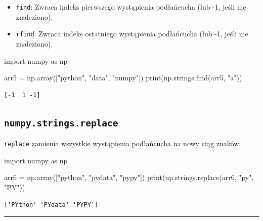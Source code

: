 \documentclass[
  letterpaper,
  DIV=11,
  numbers=noendperiod]{scrreprt}
\newenvironment{Shaded}{\begin{snugshade}}{\end{snugshade}}
\newcommand{\BuiltInTok}[1]{\textcolor[rgb]{0.00,0.23,0.31}{#1}}
\newcommand{\ImportTok}[1]{\textcolor[rgb]{0.00,0.46,0.62}{#1}}
\newcommand{\NormalTok}[1]{\textcolor[rgb]{0.00,0.23,0.31}{#1}}
\newcommand{\OperatorTok}[1]{\textcolor[rgb]{0.37,0.37,0.37}{#1}}
\newcommand{\StringTok}[1]{\textcolor[rgb]{0.13,0.47,0.30}{#1}}
\providecommand{\tightlist}{%
  \setlength{\itemsep}{0pt}\setlength{\parskip}{0pt}}\usepackage{longtable,booktabs,array}
\begin{document}
\begin{itemize}
\tightlist
\item
  \texttt{find}: Zwraca indeks pierwszego wystąpienia podłańcucha (lub
  -1, jeśli nie znaleziono).
\item
  \texttt{rfind}: Zwraca indeks ostatniego wystąpienia podłańcucha (lub
  -1, jeśli nie znaleziono).
\end{itemize}

\begin{Shaded}
\begin{Highlighting}[]
\ImportTok{import}\NormalTok{ numpy }\ImportTok{as}\NormalTok{ np}

\NormalTok{arr5 }\OperatorTok{=}\NormalTok{ np.array([}\StringTok{"python"}\NormalTok{, }\StringTok{"data"}\NormalTok{, }\StringTok{"numpy"}\NormalTok{])}
\BuiltInTok{print}\NormalTok{(np.strings.find(arr5, }\StringTok{"a"}\NormalTok{))}
\end{Highlighting}
\end{Shaded}

\begin{verbatim}
[-1  1 -1]
\end{verbatim}

\subsection{\texorpdfstring{\texttt{numpy.strings.replace}}{numpy.strings.replace}}\label{numpy.strings.replace}

\texttt{replace} zamienia wszystkie wystąpienia podłańcucha na nowy ciąg
znaków.

\begin{Shaded}
\begin{Highlighting}[]
\ImportTok{import}\NormalTok{ numpy }\ImportTok{as}\NormalTok{ np}

\NormalTok{arr6 }\OperatorTok{=}\NormalTok{ np.array([}\StringTok{"python"}\NormalTok{, }\StringTok{"pydata"}\NormalTok{, }\StringTok{"pypy"}\NormalTok{])}
\BuiltInTok{print}\NormalTok{(np.strings.replace(arr6, }\StringTok{"py"}\NormalTok{, }\StringTok{"PY"}\NormalTok{))}
\end{Highlighting}
\end{Shaded}

\begin{verbatim}
['PYthon' 'PYdata' 'PYPY']
\end{verbatim}

\begin{center}\rule{0.5\linewidth}{0.5pt}\end{center}
\end{document}
